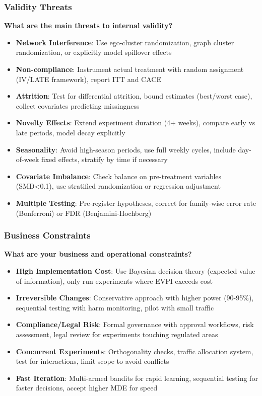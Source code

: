 \subsubsection{Validity Threats}

\textbf{What are the main threats to internal validity?}

\begin{itemize}
    \item \textbf{Network Interference}: Use ego-cluster randomization, graph cluster randomization, or explicitly model spillover effects
    \item \textbf{Non-compliance}: Instrument actual treatment with random assignment (IV/LATE framework), report ITT and CACE
    \item \textbf{Attrition}: Test for differential attrition, bound estimates (best/worst case), collect covariates predicting missingness
    \item \textbf{Novelty Effects}: Extend experiment duration (4+ weeks), compare early vs late periods, model decay explicitly
    \item \textbf{Seasonality}: Avoid high-season periods, use full weekly cycles, include day-of-week fixed effects, stratify by time if necessary
    \item \textbf{Covariate Imbalance}: Check balance on pre-treatment variables (SMD<0.1), use stratified randomization or regression adjustment
    \item \textbf{Multiple Testing}: Pre-register hypotheses, correct for family-wise error rate (Bonferroni) or FDR (Benjamini-Hochberg)
\end{itemize}

\subsubsection{Business Constraints}

\textbf{What are your business and operational constraints?}

\begin{itemize}
    \item \textbf{High Implementation Cost}: Use Bayesian decision theory (expected value of information), only run experiments where EVPI exceeds cost
    \item \textbf{Irreversible Changes}: Conservative approach with higher power (90-95\%), sequential testing with harm monitoring, pilot with small traffic
    \item \textbf{Compliance/Legal Risk}: Formal governance with approval workflows, risk assessment, legal review for experiments touching regulated areas
    \item \textbf{Concurrent Experiments}: Orthogonality checks, traffic allocation system, test for interactions, limit scope to avoid conflicts
    \item \textbf{Fast Iteration}: Multi-armed bandits for rapid learning, sequential testing for faster decisions, accept higher MDE for speed
\end{itemize}


